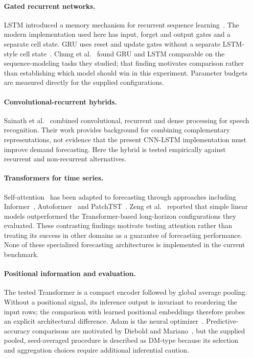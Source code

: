 \documentclass[10pt,a4paper]{article}
\begin{document}
\paragraph{Gated recurrent networks.} LSTM introduced a memory mechanism for recurrent sequence learning~\cite{hochreiter1997}. The modern implementation used here has input, forget and output gates and a separate cell state. GRU uses reset and update gates without a separate LSTM-style cell state~\cite{cho2014}. Chung et al.~\cite{chung2014} found GRU and LSTM comparable on the sequence-modeling tasks they studied; that finding motivates comparison rather than establishing which model should win in this experiment. Parameter budgets are measured directly for the supplied configurations.

\paragraph{Convolutional-recurrent hybrids.} Sainath et al.~\cite{sainath2015} combined convolutional, recurrent and dense processing for speech recognition. Their work provides background for combining complementary representations, not evidence that the present CNN-LSTM implementation must improve demand forecasting. Here the hybrid is tested empirically against recurrent and non-recurrent alternatives.

\paragraph{Transformers for time series.} Self-attention~\cite{vaswani2017} has been adapted to forecasting through approaches including Informer~\cite{zhou2021}, Autoformer~\cite{wu2021} and PatchTST~\cite{nie2023}. Zeng et al.~\cite{zeng2023} reported that simple linear models outperformed the Transformer-based long-horizon configurations they evaluated. These contrasting findings motivate testing attention rather than treating its success in other domains as a guarantee of forecasting performance. None of these specialized forecasting architectures is implemented in the current benchmark.

\paragraph{Positional information and evaluation.} The tested Transformer is a compact encoder followed by global average pooling. Without a positional signal, its inference output is invariant to reordering the input rows; the comparison with learned positional embeddings therefore probes an explicit architectural difference. Adam is the neural optimizer~\cite{kingma2015}. Predictive-accuracy comparisons are motivated by Diebold and Mariano~\cite{diebold1995}, but the supplied pooled, seed-averaged procedure is described as DM-type because its selection and aggregation choices require additional inferential caution.
\end{document}
